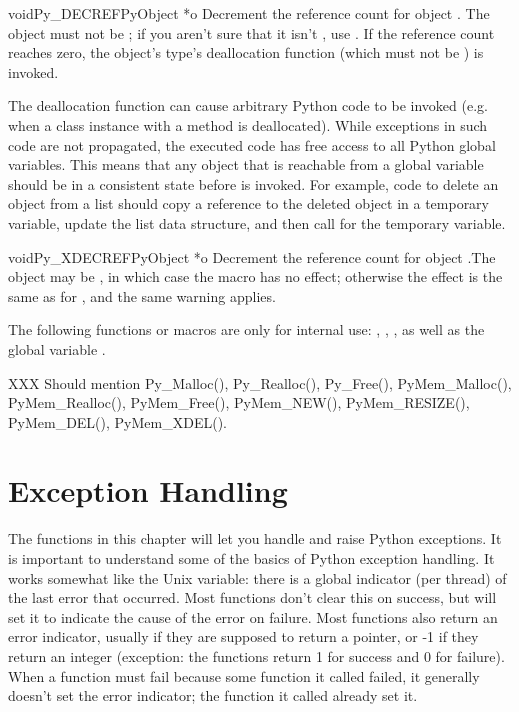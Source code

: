 \documentclass[twoside]{report}
\begin{document}
\begin{cfuncdesc}{void}{Py_DECREF}{PyObject *o}
Decrement the reference count for object .  The object must
not be \NULL{}; if you aren't sure that it isn't \NULL{}, use
.  If the reference count reaches zero, the object's
type's deallocation function (which must not be \NULL{}) is invoked.

 The deallocation function can cause arbitrary Python
code to be invoked (e.g. when a class instance with a 
method is deallocated).  While exceptions in such code are not
propagated, the executed code has free access to all Python global
variables.  This means that any object that is reachable from a global
variable should be in a consistent state before  is
invoked.  For example, code to delete an object from a list should
copy a reference to the deleted object in a temporary variable, update
the list data structure, and then call  for the
temporary variable.
\end{cfuncdesc}

\begin{cfuncdesc}{void}{Py_XDECREF}{PyObject *o}
Decrement the reference count for object .The object may be
\NULL{}, in which case the macro has no effect; otherwise the
effect is the same as for , and the same warning
applies.
\end{cfuncdesc}

The following functions or macros are only for internal use:
, , ,
as well as the global variable .

XXX Should mention Py_Malloc(), Py_Realloc(), Py_Free(),
PyMem_Malloc(), PyMem_Realloc(), PyMem_Free(), PyMem_NEW(),
PyMem_RESIZE(), PyMem_DEL(), PyMem_XDEL().


\chapter{Exception Handling}

The functions in this chapter will let you handle and raise Python
exceptions.  It is important to understand some of the basics of
Python exception handling.  It works somewhat like the Unix
 variable: there is a global indicator (per thread) of the
last error that occurred.  Most functions don't clear this on success,
but will set it to indicate the cause of the error on failure.  Most
functions also return an error indicator, usually \NULL{} if they are
supposed to return a pointer, or -1 if they return an integer
(exception: the  functions return 1 for success and
0 for failure).  When a function must fail because some function it
called failed, it generally doesn't set the error indicator; the
function it called already set it.
\end{document}
